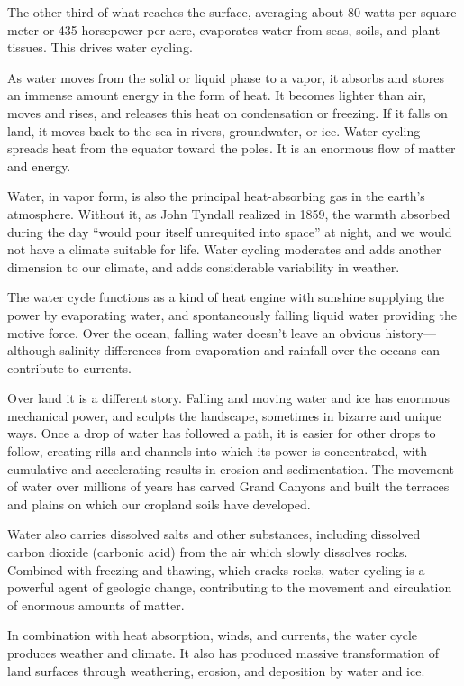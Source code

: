 \documentclass[11pt,letterpaper,twoside,onecolumn]{memoir}
\begin{document}
The other third of what reaches the surface, averaging about 80 watts per square meter or 435 horsepower per acre, evaporates water from seas, soils, and plant tissues. This drives water cycling.

As water moves from the solid or liquid phase to a vapor, it absorbs and stores an immense amount energy in the form of heat. It becomes lighter than air, moves and rises, and releases this heat on condensation or freezing. If it falls on land, it moves back to the sea in rivers, groundwater, or ice. Water cycling spreads heat from the equator toward the poles. It is an enormous flow of matter and energy.

Water, in vapor form, is also the principal heat-absorbing gas in the earth's atmosphere. Without it, as John Tyndall realized in 1859, the warmth absorbed during the day ``would pour itself unrequited into space'' at night, and we would not have a climate suitable for life.\label{water} Water cycling moderates and adds another dimension to our climate, and adds considerable variability in weather.

The water cycle functions as a kind of heat engine with sunshine supplying the power by evaporating water, and spontaneously falling liquid water providing the motive force. Over the ocean, falling water doesn't leave an obvious history---although salinity differences from evaporation and rainfall over the oceans can contribute to currents.

Over land it is a different story. Falling and moving water and ice has enormous mechanical power, and sculpts the landscape, sometimes in bizarre and unique ways. Once a drop of water has followed a path, it is easier for other drops to follow, creating rills and channels into which its power is concentrated, with cumulative and accelerating results in erosion and sedimentation. The movement of water over millions of years has carved Grand Canyons and built the terraces and plains on which our cropland soils have developed.

Water also carries dissolved salts and other substances, including dissolved carbon dioxide (carbonic acid) from the air which slowly dissolves rocks. Combined with freezing and thawing, which cracks rocks, water cycling is a powerful agent of geologic change, contributing to the movement and circulation of enormous amounts of matter.

In combination with heat absorption, winds, and currents, the water cycle produces weather and climate. It also has produced massive transformation of land surfaces through weathering, erosion, and deposition by water and ice.
\end{document}
